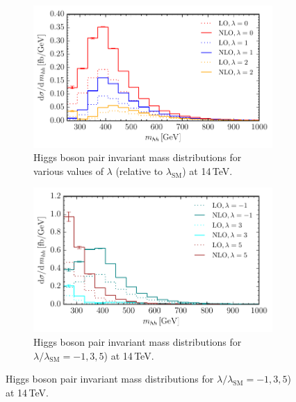 \begin{figure}[htb]
 \begin{subfigure}{0.495\textwidth}
\includegraphics[width=\textwidth]{plots/mhh_Kfac_14TeV_varylambda_small.pdf}
 \caption{Higgs boson pair invariant mass distributions for various values of $\lambda$ (relative to $\lambda_{\mathrm{SM}}$)  at 14\,TeV.}
\label{fig:lambda_small}
\end{subfigure}
\hfill
\begin{subfigure}{0.495\textwidth}
    \includegraphics[width=\textwidth]{plots/mhh_Kfac_14TeV_varylambda_large.pdf}
\caption{Higgs boson pair invariant mass distributions for $\lambda/\lambda_{\mathrm{SM}}=-1,3,5$)  at 14\,TeV.}
\label{fig:lambda_large}
\end{subfigure}
\label{fig:lambdavar14TeV}
\end{figure}



